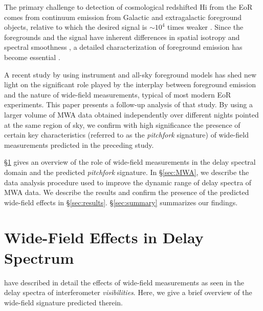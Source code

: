 \documentclass[preprint2,apjl,numberedappendix,twocolappendix,appendixfloats]{emulateapj}
\begin{document}
The primary challenge to detection of cosmological redshifted H{\sc i} from the EoR comes from continuum emission from Galactic and extragalactic foreground objects, relative to which the desired signal is $\sim 10^4$ times weaker \citep[see, e.g.,][]{dim02,zal04,fur06,ali08,ber09,ber10,gho12}. Since the foregrounds and the signal have inherent differences in spatial isotropy and spectral smoothness \citep{mor04,mor06,bow09,liu11,par12b,dil13,pob13}, a detailed characterization of foreground emission has become essential \citep{bow09,liu09,dat10,liu11,mor12,tro12,pob13,dil14,liu14a,liu14b,thy13,thy15}.

A recent study by \citet{thy15} using instrument and all-sky foreground models has shed new light on the significant role played by the interplay between foreground emission and the nature of wide-field measurements, typical of most modern EoR experiments. This paper presents a follow-up analysis of that study. By using a larger volume of MWA data obtained independently over different nights pointed at the same region of sky, we confirm with high significance the presence of certain key characteristics (referred to as the {\it pitchfork} signature) of wide-field measurements predicted in the preceding study.

\S\ref{sec:wide-field} gives an overview of the role of wide-field measurements in the delay spectral domain and the predicted {\it pitchfork} signature. In \S\ref{sec:MWA}, we describe the data analysis procedure used to improve the dynamic range of delay spectra of MWA data. We describe the results and confirm the presence of the predicted wide-field effects in \S\ref{sec:results}. \S\ref{sec:summary} summarizes our findings.

\section{Wide-Field Effects in Delay Spectrum}\label{sec:wide-field}

\citet{thy15} have described in detail the effects of wide-field measurements as seen in the delay spectra of interferometer {\it visibilities}. Here, we give a brief overview of the wide-field signature predicted therein. 
\end{document}

